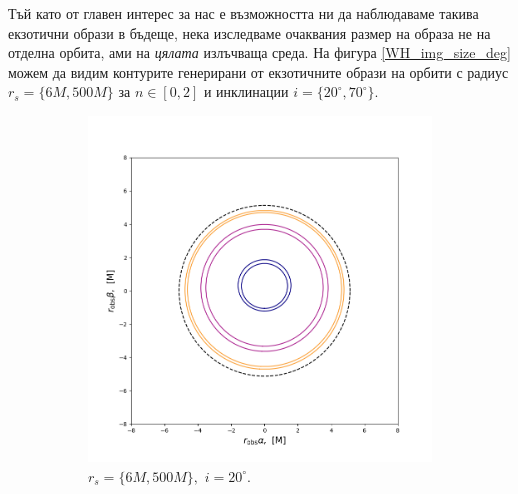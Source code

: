 Тъй като от главен интерес за нас е възможността ни да наблюдаваме такива екзотични образи в бъдеще, нека изследваме очаквания размер на образа не на отделна орбита, ами на \emph{цялата} излъчваща среда. На фигура \ref{WH_img_size_deg} можем да видим контурите генерирани от екзотичните образи на орбити с радиус $r_s = \{6M, 500M\}$ за $n\in[0,2]$ и инклинации $i = \{20^\circ,70^\circ\}$.

\begin{figure}[!htb]
	\centering
	\begin{subfigure}{6cm}
		\hspace{-1.2cm}
		\includegraphics[scale = 0.35]{WH_20_deg_r6_r500.png}
		\caption{$r_s = \{6M, 500M\},\,\, i = 20^\circ$.}
	\end{subfigure}\,\,\,
	\begin{subfigure}{6cm}
		\hspace{-0.7cm}

\end{subfigure}
\end{figure}
